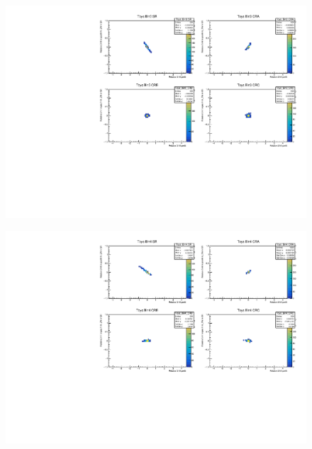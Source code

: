 \begin{figure}[H]
\includegraphics[width=\textwidth]{plots/diffx/instab/constfx/instabilities_mjj_QCD_Sh2211_Signal_Sh2211_BSMCQCDSTATS_madgraphasimov_bin3.pdf}
\end{figure}
\begin{figure}[H]
\includegraphics[width=\textwidth]{plots/diffx/instab/constfx/instabilities_mjj_QCD_Sh2211_Signal_Sh2211_BSMCQCDSTATS_madgraphasimov_bin4.pdf}
\end{figure}

